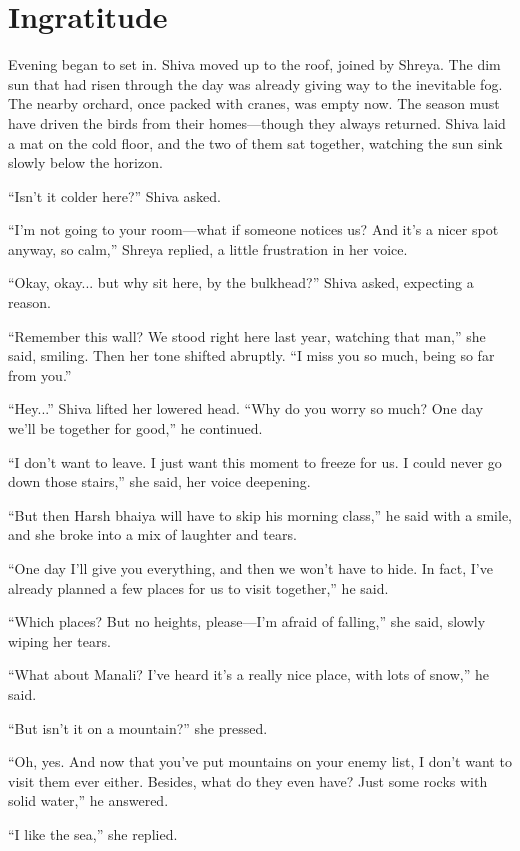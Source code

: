\chapter{Ingratitude}

Evening began to set in. Shiva moved up to the roof, joined by Shreya. The dim sun that had risen through the day was already giving way to the inevitable fog. The nearby orchard, once packed with cranes, was empty now. The season must have driven the birds from their homes—though they always returned. Shiva laid a mat on the cold floor, and the two of them sat together, watching the sun sink slowly below the horizon.

``Isn't it colder here?'' Shiva asked.

``I'm not going to your room—what if someone notices us? And it's a nicer spot anyway, so calm,'' Shreya replied, a little frustration in her voice.

``Okay, okay... but why sit here, by the bulkhead?'' Shiva asked, expecting a reason.

``Remember this wall? We stood right here last year, watching that man,'' she said, smiling. Then her tone shifted abruptly. ``I miss you so much, being so far from you.''

``Hey...'' Shiva lifted her lowered head. ``Why do you worry so much? One day we'll be together for good,'' he continued.

``I don't want to leave. I just want this moment to freeze for us. I could never go down those stairs,'' she said, her voice deepening.

``But then Harsh bhaiya will have to skip his morning class,'' he said with a smile, and she broke into a mix of laughter and tears.

``One day I'll give you everything, and then we won't have to hide. In fact, I've already planned a few places for us to visit together,'' he said.

``Which places? But no heights, please—I'm afraid of falling,'' she said, slowly wiping her tears.

``What about Manali? I've heard it's a really nice place, with lots of snow,'' he said.

``But isn't it on a mountain?'' she pressed.

``Oh, yes. And now that you've put mountains on your enemy list, I don't want to visit them ever either. Besides, what do they even have? Just some rocks with solid water,'' he answered.

``I like the sea,'' she replied.

